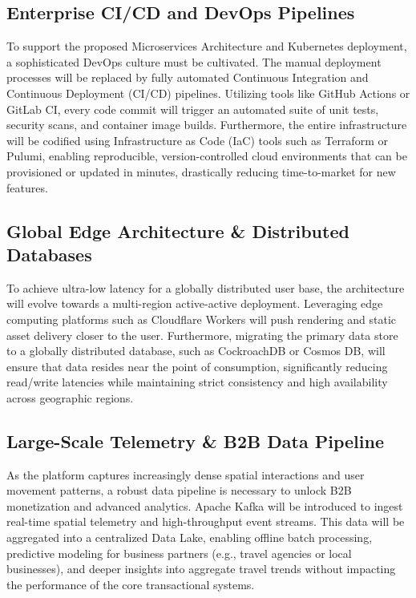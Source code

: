 \subsection{Enterprise CI/CD and DevOps Pipelines}
To support the proposed Microservices Architecture and Kubernetes deployment, a sophisticated DevOps culture must be cultivated. The manual deployment processes will be replaced by fully automated Continuous Integration and Continuous Deployment (CI/CD) pipelines. Utilizing tools like GitHub Actions or GitLab CI, every code commit will trigger an automated suite of unit tests, security scans, and container image builds. Furthermore, the entire infrastructure will be codified using Infrastructure as Code (IaC) tools such as Terraform or Pulumi, enabling reproducible, version-controlled cloud environments that can be provisioned or updated in minutes, drastically reducing time-to-market for new features.

\subsection{Global Edge Architecture \& Distributed Databases}
To achieve ultra-low latency for a globally distributed user base, the architecture will evolve towards a multi-region active-active deployment. Leveraging edge computing platforms such as Cloudflare Workers will push rendering and static asset delivery closer to the user. Furthermore, migrating the primary data store to a globally distributed database, such as CockroachDB or Cosmos DB, will ensure that data resides near the point of consumption, significantly reducing read/write latencies while maintaining strict consistency and high availability across geographic regions.

\subsection{Large-Scale Telemetry \& B2B Data Pipeline}
As the platform captures increasingly dense spatial interactions and user movement patterns, a robust data pipeline is necessary to unlock B2B monetization and advanced analytics. Apache Kafka will be introduced to ingest real-time spatial telemetry and high-throughput event streams. This data will be aggregated into a centralized Data Lake, enabling offline batch processing, predictive modeling for business partners (e.g., travel agencies or local businesses), and deeper insights into aggregate travel trends without impacting the performance of the core transactional systems.

